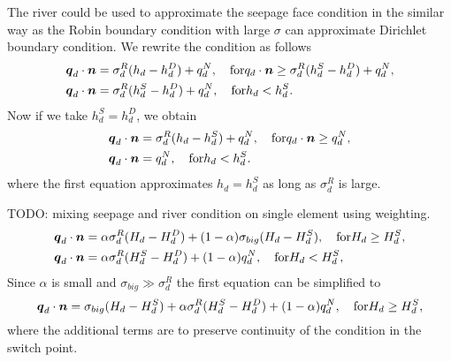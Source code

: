 The river could be used to approximate the seepage face condition in the similar way as the Robin boundary condition with large $\sigma$ 
can approximate Dirichlet boundary condition. We rewrite the condition as follows
\begin{align}
  \mathbf{\boldsymbol{q}}_d \cdot \mathbf{\boldsymbol{n}} &= \sigma_d^R ( h_d - h_d^D) + q_d^N, \quad \text{for} q_d \cdot \mathbf{\boldsymbol{n}} \ge \sigma_d^R ( h_d^S - h_d^D) + q_d^N,\\
  \mathbf{\boldsymbol{q}}_d \cdot \mathbf{\boldsymbol{n}} &= \sigma_d^R ( h_d^S - h_d^D)+q_d^N, \quad \text{for} h_d < h_d^S.
\end{align}
Now if we take $h_d^S=h_d^D$, we obtain
\begin{align}
  \mathbf{\boldsymbol{q}}_d \cdot \mathbf{\boldsymbol{n}} &= \sigma_d^R ( h_d - h_d^S) + q_d^N, \quad \text{for} q_d \cdot \mathbf{\boldsymbol{n}} \ge q_d^N,\\
  \mathbf{\boldsymbol{q}}_d \cdot \mathbf{\boldsymbol{n}} &= q_d^N, \quad \text{for} h_d < h_d^S.
\end{align}
where the first equation approximates $h_d = h_d^S$ as long as $\sigma_d^R$ is large.

TODO: mixing seepage and river condition on single element using weighting.
\begin{align}
  \mathbf{\boldsymbol{q}}_d \cdot \mathbf{\boldsymbol{n}} &= \alpha \sigma_d^R ( H_d - H_d^D) + (1-\alpha) \sigma_{big}(H_d - H_d^S), \quad \text{for} H_d \ge H_d^S,\\
  \mathbf{\boldsymbol{q}}_d \cdot \mathbf{\boldsymbol{n}} &= \alpha \sigma_d^R ( H_d^S - H_d^D)+(1-\alpha) q_d^N, \quad \text{for} H_d < H_d^S,
\end{align}
Since $\alpha$ is small and $\sigma_{big} \gg \sigma_d^R$ the first equation can be simplified to 
\[
    \mathbf{\boldsymbol{q}}_d \cdot \mathbf{\boldsymbol{n}} = \sigma_{big}(H_d - H_d^S) + \alpha \sigma_d^R ( H_d^S - H_d^D)+(1-\alpha) q_d^N, \quad \text{for} H_d \ge H_d^S,
\]
where the additional terms are to preserve continuity of the condition in the switch point.



